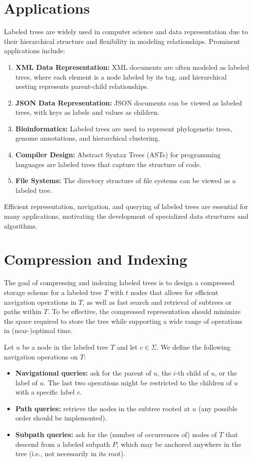 \section{Applications}
Labeled trees are widely used in computer science and data representation due to their hierarchical structure and flexibility in modeling relationships. Prominent applications include:
\begin{enumerate}
    \item \textbf{XML Data Representation:} XML documents are often modeled as labeled trees, where each element is a node labeled by its tag, and hierarchical nesting represents parent-child relationships.
    \item \textbf{JSON Data Representation:} JSON documents can be viewed as labeled trees, with keys as labels and values as children.
    \item \textbf{Bioinformatics:} Labeled trees are used to represent phylogenetic trees, genome annotations, and hierarchical clustering.
    \item \textbf{Compiler Design:} Abstract Syntax Trees (ASTs) for programming languages are labeled trees that capture the structure of code.
    \item \textbf{File Systems:} The directory structure of file systems can be viewed as a labeled tree.
\end{enumerate}

Efficient representation, navigation, and querying of labeled trees are essential for many applications, motivating the development of specialized data structures and algorithms. 

\section{Compression and Indexing} \label{compandindexinglabtree}
The goal of compressing and indexing labeled trees is to design a compressed storage scheme for a labeled tree $T$ with $t$ nodes that allows for efficient navigation operations in $T$, as well as fast search and retrieval of subtrees or paths within $T$. To be effective, the compressed representation should minimize the space required to store the tree while supporting a wide range of operations in (near-)optimal time.

Let $u$ be a node in the labeled tree $T$ and let $c \in \Sigma$. We define the following navigation operations on $T$:
\begin{itemize}
    \item \textbf{Navigational queries:} ask for the parent of $u$, the $i$-th child of $u$, or the label of $u$. The last two operations might be restricted to the children of $u$ with a specific label $c$.
    \item \textbf{Path queries:} retrieve the nodes in the subtree rooted at $u$ (any possible order should be implemented).
    \item \textbf{Subpath queries:} ask for the (number of occurrences of) nodes of $T$ that descend from a labeled subpath $P$, which may be anchored anywhere in the tree (i.e., not necessarily in its root). 
\end{itemize}


